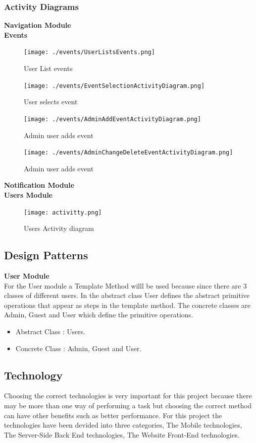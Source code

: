 \documentclass[a4paper,12pt]{report}
\begin{document}
		\subsubsection{Activity Diagrams}
	\textbf{Navigation Module}\\
	\textbf{Events}\\
	\begin{figure}[h!]
	\texttt{[image: ./events/UserListsEvents.png]}
    \caption{User List events}
		 \label{fig:1}
\end{figure}
\begin{figure}[h!]
\texttt{[image: ./events/EventSelectionActivityDiagram.png]}
    \caption{User selects event}
		 \label{fig:2}
\end{figure}
\begin{figure}[h!]
\texttt{[image: ./events/AdminAddEventActivityDiagram.png]}
    \caption{Admin user adds event}
		 \label{fig:3}
\end{figure}
\begin{figure}[h!]
	\texttt{[image: ./events/AdminChangeDeleteEventActivityDiagram.png]}
	\caption{Admin user adds event}
	\label{fig:3}
\end{figure}

	\textbf{Notification Module}\\
	\textbf{Users Module}\\
	\begin{figure}[h!]
		\texttt{[image: activitty.png]}
		\caption{Users Activity diagram}
		\label{fig:Users Activity diagram}
	\end{figure}
	
	\newpage

\newpage
\subsection{Design Patterns}
\textbf{User Module}\\	
	For the User module a Template Method willl be used because since there are 3 classes of different users. In the abstract class User defines the abstract primitive operations that appear as steps in the template method. The concrete classes are Admin, Guest and User which define the primitive operations.
	\begin{itemize}
		\item Abstract Class : Users.
		\item Concrete Class : Admin, Guest and User.
	\end{itemize}
\newpage
\subsection{Technology}
Choosing the correct technologies is very important for this project because there may be  more than one way of performing a task but choosing the correct method can have other benefits such as better performance.
For this project the technologies have been devided into three categories, The Mobile technologies, The Server-Side Back End technologies, The Website Front-End technologies.
\end{document}

